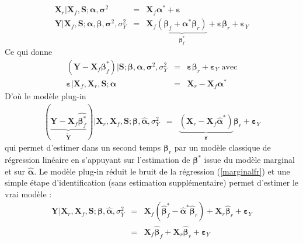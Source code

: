 \documentclass[12pt,a4paper]{report}
\begin{document}
\begin{eqnarray}
			\boldsymbol{X}_{r}|\boldsymbol{X}_f,\boldsymbol{S};\boldsymbol{\alpha},\boldsymbol{\sigma}^2&=&\boldsymbol{X}_{f}\boldsymbol{\alpha}^*+\boldsymbol{\varepsilon} \\
			\boldsymbol{Y}|\boldsymbol{X}_f,\boldsymbol{S};\boldsymbol{\alpha},\boldsymbol{\beta},\boldsymbol{\sigma}^2,\sigma^2_Y &=& \boldsymbol{X}_{f}\underbrace{(\boldsymbol{\beta}_{f}+\boldsymbol{\alpha}^*\boldsymbol{\beta}_{r})}_{\boldsymbol{\beta}^*_f}+\boldsymbol{\varepsilon}\boldsymbol{\beta}_{r}+\boldsymbol{\varepsilon}_Y 
					\end{eqnarray}		 
Ce qui donne 
		\begin{eqnarray}
			(\boldsymbol{Y}- \boldsymbol{X}_{f}\boldsymbol{\beta}^*_f)|\boldsymbol{S};\boldsymbol{\beta},\boldsymbol{\alpha},\boldsymbol{\sigma}^2,\sigma^2_Y &=&\boldsymbol{\varepsilon}\boldsymbol{\beta}_{r}+\boldsymbol{\varepsilon}_Y \textrm{ avec}\\
			\boldsymbol{\varepsilon}|\boldsymbol{X}_f,\boldsymbol{X}_r,\boldsymbol{S};\boldsymbol{\alpha} &=&\boldsymbol{X}_{r}-\boldsymbol{X}_{f}\boldsymbol{\alpha}^*
		\end{eqnarray}		 
D'où le modèle plug-in 
		\begin{eqnarray}
			(\underbrace{\boldsymbol{Y}- \boldsymbol{X}_{f}\hat{\boldsymbol{\beta}^*_f}}_{\tilde{\boldsymbol{Y}}})|\boldsymbol{X}_r,\boldsymbol{X}_f,\boldsymbol{S};\boldsymbol{\beta},\hat{\boldsymbol{\alpha}},\sigma^2_Y &=&\underbrace{(\boldsymbol{X}_{r}-\boldsymbol{X}_{f}\hat{\boldsymbol{\alpha}}^*)}_{\hat{\boldsymbol{\varepsilon}}}\boldsymbol{\beta}_{r}+\boldsymbol{\varepsilon}_Y 
		\end{eqnarray}
		qui permet d'estimer dans un second temps $\boldsymbol{\beta}_{r}$ par un modèle classique de régression linéaire en s'appuyant sur l'estimation de $\boldsymbol{\beta}^*$ issue du modèle marginal et sur $\hat{\boldsymbol{\alpha}}$.
		Le modèle plug-in réduit le bruit de la régression (\ref{marginalfr}) et
		une simple étape d'identification (sans estimation supplémentaire) permet d'estimer le vrai modèle :
		\begin{eqnarray}
			\boldsymbol{Y}|\boldsymbol{X}_r,\boldsymbol{X}_f,\boldsymbol{S};\boldsymbol{\beta},\hat{\boldsymbol{\alpha}},\sigma^2_Y&=& \boldsymbol{X}_{f}(\hat{\boldsymbol{\beta}}^*_f-\hat{\boldsymbol{\alpha}}^*\hat{\boldsymbol{\beta}}_{r}) + \boldsymbol{X}_{r}\hat{\boldsymbol{\beta}}_{r}+\boldsymbol{\varepsilon}_Y \\
			&=&\boldsymbol{X}_{f}\hat{\boldsymbol{\beta}}_{f}+\boldsymbol{X}_{r}\hat{\boldsymbol{\beta}}_{r}+\boldsymbol{\varepsilon}_Y
		\end{eqnarray}
	
\end{document}
